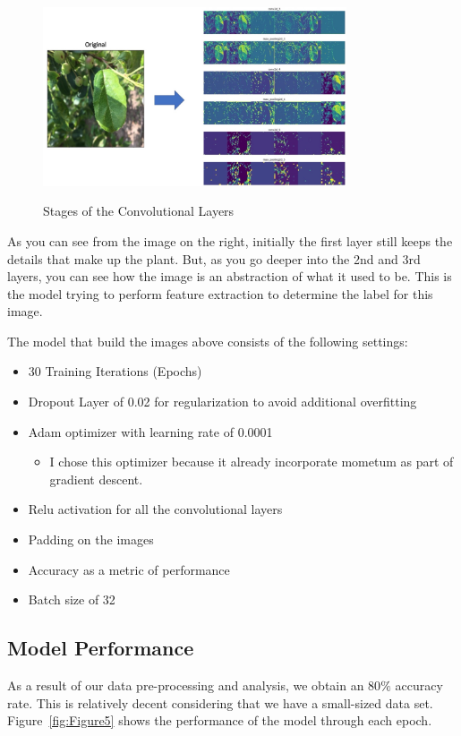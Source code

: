 \documentclass[man,floatsintext]{apa7}
\begin{document}
\begin{singlespace}
\begin{figure}
  \centering
  \caption{Stages of the Convolutional Layers}
  \includegraphics[width=0.8\textwidth]{images/image4.jpg}
  \label{fig:Figure4}
\end{figure}

As you can see from the image on the right, initially the first layer still keeps the details that make up the plant. But, as you go deeper into the 2nd and 3rd layers, you can see how the image is an abstraction of what it used to be. This is the model trying to perform feature extraction to determine the label for this image.

The model that build the images above consists of the following settings:
\begin{itemize}[itemsep=1mm, parsep=0pt]
  \item 30 Training Iterations (Epochs)
  \item Dropout Layer of 0.02 for regularization to avoid additional overfitting
  \item Adam optimizer with learning rate of 0.0001
  \begin{itemize}[label=$\circ$]
    \item I chose this optimizer because it already incorporate mometum as
part of gradient descent.
    \end{itemize}
  \item Relu activation for all the convolutional layers
  \item Padding on the images
  \item Accuracy as a metric of performance
  \item Batch size of 32
\end{itemize}

\subsection{Model Performance}
As a result of our data pre-processing and analysis, we obtain an 80$\%$ accuracy rate. This is relatively decent considering that we have a small-sized data set. Figure~\ref{fig:Figure5} shows the performance of the model through each epoch.


\end{singlespace}
\end{document}
